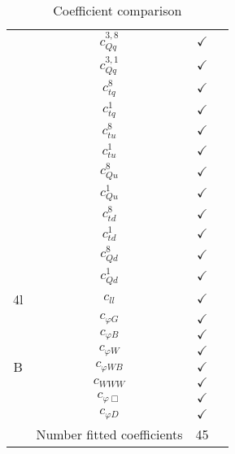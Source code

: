 \documentclass{article}
\begin{document}
\begin{table}[H]
\begin{tabular}{|c|c|c|c|}
 & $c_{Qq}^{3,8}$ & $\checkmark$ & \\ \cline{2-4}
 & $c_{Qq}^{3,1}$ & $\checkmark$ & \\ \cline{2-4}
 & $c_{tq}^{8}$ & $\checkmark$ & \\ \cline{2-4}
 & $c_{tq}^{1}$ & $\checkmark$ & \\ \cline{2-4}
 & $c_{tu}^{8}$ & $\checkmark$ & \\ \cline{2-4}
 & $c_{tu}^{1}$ & $\checkmark$ & \\ \cline{2-4}
 & $c_{Qu}^{8}$ & $\checkmark$ & \\ \cline{2-4}
 & $c_{Qu}^{1}$ & $\checkmark$ & \\ \cline{2-4}
 & $c_{td}^{8}$ & $\checkmark$ & \\ \cline{2-4}
 & $c_{td}^{1}$ & $\checkmark$ & \\ \cline{2-4}
 & $c_{Qd}^{8}$ & $\checkmark$ & \\ \cline{2-4}
 & $c_{Qd}^{1}$ & $\checkmark$ & 
\\ \hline
\multirow{1}{*}{4l}
 & $c_{ll}$ & $\checkmark$ & 
\\ \hline
\multirow{7}{*}{B}
 & $c_{\varphi G}$ & $\checkmark$ & \\ \cline{2-4}
 & $c_{\varphi B}$ & $\checkmark$ & \\ \cline{2-4}
 & $c_{\varphi W}$ & $\checkmark$ & \\ \cline{2-4}
 & $c_{\varphi WB}$ & $\checkmark$ & \\ \cline{2-4}
 & $c_{WWW}$ & $\checkmark$ & \\ \cline{2-4}
 & $c_{\varphi \Box}$ & $\checkmark$ & \\ \cline{2-4}
 & $c_{\varphi D}$ & $\checkmark$ & 
\\ \hline
\hline & Number fitted coefficients & 45 &  \\ \hline
\end{tabular}
\caption{Coefficient comparison}
\end{table}
\end{document}
